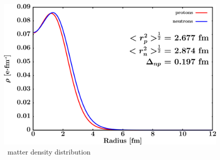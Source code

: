\begin{figure}[hbtp]
    \centering
    \begin{minipage}{0.70\textwidth}
        \centering
        \includegraphics[width=\linewidth]{figures/o18_matterDensity.png}
        \caption*{\oEight\ matter density distribution}
        \label{DOMFitData_o18_matterDensity}
    \end{minipage}
\end{figure}

